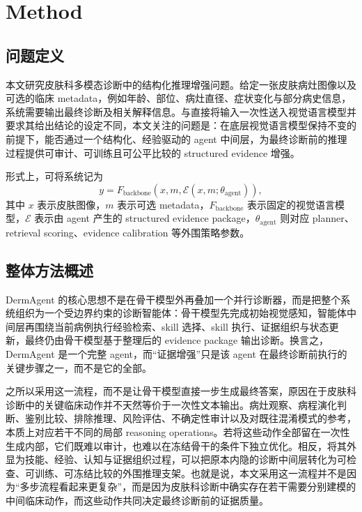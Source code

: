 \documentclass{article}
\begin{document}
\section{Method}

\subsection{问题定义}

本文研究皮肤科多模态诊断中的结构化推理增强问题。给定一张皮肤病灶图像以及可选的临床 metadata，例如年龄、部位、病灶直径、症状变化与部分病史信息，系统需要输出最终诊断及相关解释信息。与直接将输入一次性送入视觉语言模型并要求其给出结论的设定不同，本文关注的问题是：在底层视觉语言模型保持不变的前提下，能否通过一个结构化、经验驱动的 agent 中间层，为最终诊断前的推理过程提供可审计、可训练且可公平比较的 structured evidence 增强。

形式上，可将系统记为
\begin{equation}
y = F_{\mathrm{backbone}}(x, m, \mathcal{E}(x,m;\theta_{\mathrm{agent}})),
\end{equation}
其中 $x$ 表示皮肤图像，$m$ 表示可选 metadata，$F_{\mathrm{backbone}}$ 表示固定的视觉语言模型，$\mathcal{E}$ 表示由 agent 产生的 structured evidence package，$\theta_{\mathrm{agent}}$ 则对应 planner、retrieval scoring、evidence calibration 等外围策略参数。

\subsection{整体方法概述}

DermAgent 的核心思想不是在骨干模型外再叠加一个并行诊断器，而是把整个系统组织为一个受边界约束的诊断智能体：骨干模型先完成初始视觉感知，智能体中间层再围绕当前病例执行经验检索、skill 选择、skill 执行、证据组织与状态更新，最终仍由骨干模型基于整理后的 evidence package 输出诊断。换言之，DermAgent 是一个完整 agent，而“证据增强”只是该 agent 在最终诊断前执行的关键步骤之一，而不是它的全部。

之所以采用这一流程，而不是让骨干模型直接一步生成最终答案，原因在于皮肤科诊断中的关键临床动作并不天然等价于一次性文本输出。病灶观察、病程演化判断、鉴别比较、排除推理、风险评估、不确定性审计以及对既往混淆模式的参考，本质上对应若干不同的局部 reasoning operations。若将这些动作全部留在一次性生成内部，它们既难以审计，也难以在冻结骨干的条件下独立优化。相反，将其外显为技能、经验、认知与证据组织过程，可以把原本内隐的诊断中间层转化为可检查、可训练、可冻结比较的外围推理支架。也就是说，本文采用这一流程并不是因为“多步流程看起来更复杂”，而是因为皮肤科诊断中确实存在若干需要分别建模的中间临床动作，而这些动作共同决定最终诊断前的证据质量。
\end{document}
